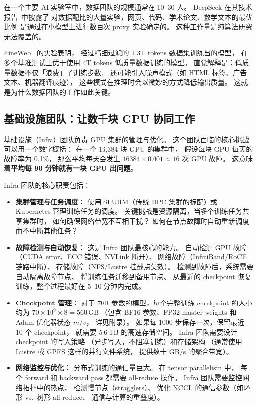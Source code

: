 在一个主要 AI 实验室中，数据团队的规模通常在 10--30 人。
DeepSeek 在其技术报告~\cite{deepseekv3}中披露了
对数据配比的大量实验，网页、代码、学术论文、数学文本的最优比例
是通过在小模型上进行数百次 proxy 实验确定的。
这种工作量是纯算法研究无法覆盖的。

\begin{whybox}
FineWeb~\cite{penedo2024fineweb} 的实验表明，
经过精细过滤的 1.3T tokens 数据集训练出的模型，
在多个基准测试上优于使用 4T tokens 低质量数据训练的模型。
直觉解释是：低质量数据不仅「浪费」了训练步数，
还可能引入噪声模式（如 HTML 标签、广告文本、机器翻译痕迹），
这些模式在推理时会以微妙的方式降低输出质量。
这就是为什么数据团队的工作如此关键。
\end{whybox}

\subsection{基础设施团队：让数千块 GPU 协同工作}

基础设施（Infra）团队负责 GPU 集群的管理与优化。
这个团队面临的核心挑战可以用一个数字概括：
在一个 16,384 块 GPU 的集群中，
假设每块 GPU 每天的故障率为 0.1\%，
那么平均每天会发生 $16384 \times 0.001 \approx 16$ 次 GPU 故障。
这意味着\textbf{平均每 90 分钟就有一块 GPU 出问题}。

Infra 团队的核心职责包括：

\begin{itemize}[noitemsep]
  \item \textbf{集群管理与任务调度}：
        使用 SLURM（传统 HPC 集群的标配）或 Kubernetes
        管理训练任务的调度。
        关键挑战是资源隔离，当多个训练任务共享集群时，
        如何确保网络带宽不互相干扰？
        如何在节点故障时自动重新调度而不中断其他任务？
  \item \textbf{故障检测与自动恢复}：
        这是 Infra 团队最核心的能力。
        自动检测 GPU 故障（CUDA error、ECC 错误、NVLink 断开）、
        网络故障（InfiniBand/RoCE 链路中断）、
        存储故障（NFS/Lustre 挂载点失效）。
        检测到故障后，系统需要自动隔离故障节点、
        将训练任务迁移到备用节点、
        从最近的 checkpoint 恢复训练，整个过程最好在 5--10 分钟内完成。
  \item \textbf{Checkpoint 管理}：
        对于 70B 参数的模型，每个完整训练 checkpoint 的大小约为
        $70 \times 10^9 \times 8 = 560\,\mathrm{GB}$
        （包含 BF16 参数、FP32 master weights 和 Adam 优化器状态 $m$/$v$，
        详见附录）。
        如果每 1000 步保存一次，保留最近 10 个 checkpoint，
        就需要 5.6\,TB 的高速存储空间。
        Infra 团队需要设计 checkpoint 的写入策略
        （异步写入，不阻塞训练）和存储架构
        （通常使用 Lustre 或 GPFS 这样的并行文件系统，
        提供数十 GB/s 的聚合带宽）。
  \item \textbf{网络监控与优化}：
        分布式训练的通信量巨大。
        在 tensor parallelism 中，
        每个 forward 和 backward pass 都需要 all-reduce 操作。
        Infra 团队需要监控网络拓扑中的热点、
        检测慢节点（stragglers）、
        优化 NCCL 的通信参数（如环形 vs.\ 树形 all-reduce、
        通信与计算的重叠度）。
\end{itemize}

